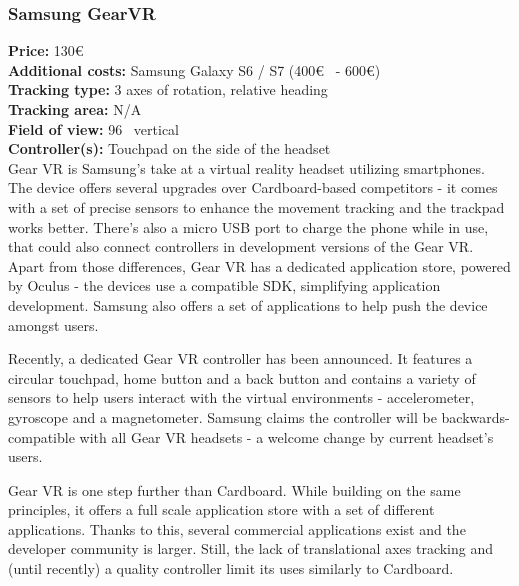 \documentclass[12pt, a4paper]{article}
\begin{document}
\subsubsection{Samsung GearVR}
\vspace*{-5mm}
\textbf{Price:} 130\euro\\
\textbf{Additional costs:} Samsung Galaxy S6 / S7 (400\euro~ - 600\euro)\\
\textbf{Tracking type:} 3 axes of rotation, relative heading\\
\textbf{Tracking area:} N/A\\
\textbf{Field of view:} 96\degree~ vertical\\
\textbf{Controller(s):} Touchpad on the side of the headset \bigskip \\
Gear VR is Samsung’s take at a virtual reality headset utilizing smartphones. The device offers several upgrades over Cardboard-based competitors - it comes with a set of precise sensors to enhance the movement tracking and the trackpad works better. There’s also a micro USB port to charge the phone while in use, that could also connect controllers in development versions of the Gear VR. Apart from those differences, Gear VR has a dedicated application store, powered by Oculus - the devices use a compatible SDK, simplifying application development. Samsung also offers a set of applications to help push the device amongst users.

Recently, a dedicated Gear VR controller has been announced. It features a circular touchpad, home button and a back button and contains a variety of sensors to help users interact with the virtual environments - accelerometer, gyroscope and a magnetometer. Samsung claims the controller will be backwards-compatible with all Gear VR headsets - a welcome change by current headset’s users.

Gear VR is one step further than Cardboard. While building on the same principles, it offers a full scale application store with a set of different applications. Thanks to this, several commercial applications exist and the developer community is larger. Still, the lack of translational axes tracking and (until recently) a quality controller limit its uses similarly to Cardboard.
\end{document}
